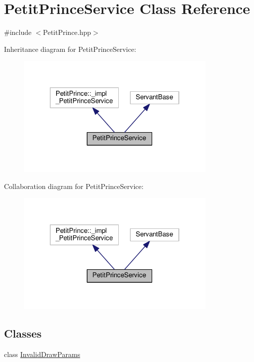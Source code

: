 \hypertarget{class_petit_prince_service}{}\section{Petit\+Prince\+Service Class Reference}
\label{class_petit_prince_service}


{\ttfamily \#include $<$Petit\+Prince.\+hpp$>$}



Inheritance diagram for Petit\+Prince\+Service\+:
\nopagebreak
\begin{figure}[H]
\begin{center}
\leavevmode
\includegraphics[width=274pt]{class_petit_prince_service__inherit__graph}
\end{center}
\end{figure}


Collaboration diagram for Petit\+Prince\+Service\+:
\nopagebreak
\begin{figure}[H]
\begin{center}
\leavevmode
\includegraphics[width=274pt]{class_petit_prince_service__coll__graph}
\end{center}
\end{figure}
\subsection*{Classes}
\begin{DoxyCompactItemize}
\item 
class \hyperlink{class_petit_prince_service_1_1_invalid_draw_params}{Invalid\+Draw\+Params}
\end{DoxyCompactItemize}
